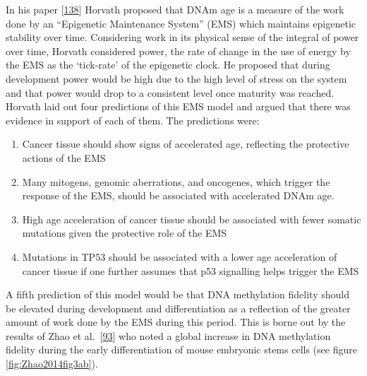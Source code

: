 \documentclass[
]{book}
\providecommand{\tightlist}{%
  \setlength{\itemsep}{0pt}\setlength{\parskip}{0pt}}
\begin{document}
In his paper {[}\protect\hyperlink{ref-Horvath2013}{138}{]} Horvath proposed that DNAm age is a measure of the work done by an ``Epigenetic Maintenance System'' (EMS) which maintains epigenetic stability over time.
Considering work in its physical sense of the integral of power over time, Horvath considered power, the rate of change in the use of energy by the EMS as the `tick-rate' of the epigenetic clock.
He proposed that during development power would be high due to the high level of stress on the system and that power would drop to a consistent level once maturity was reached.
Horvath laid out four predictions of this EMS model and argued that there was evidence in support of each of them. The predictions were:

\begin{enumerate}
\def\labelenumi{\arabic{enumi}.}
\tightlist
\item
  Cancer tissue should show signs of accelerated age, reflecting the protective actions of the EMS
\item
  Many mitogens, genomic aberrations, and oncogenes, which trigger the response of the EMS, should be associated with accelerated DNAm age.
\item
  High age acceleration of cancer tissue should be associated with fewer somatic mutations given the protective role of the EMS
\item
  Mutations in TP53 should be associated with a lower age acceleration of cancer tissue if one further assumes that p53 signalling helps trigger the EMS
\end{enumerate}

A fifth prediction of this model would be that DNA methylation fidelity should be elevated during development and differentiation as a reflection of the greater amount of work done by the EMS during this period.
This is borne out by the results of Zhao et al.~{[}\protect\hyperlink{ref-Zhao2014}{93}{]} who noted a global increase in DNA methylation fidelity during the early differentiation of mouse embryonic stems cells (see figure \ref{fig:Zhao2014fig3ab}).
\end{document}
